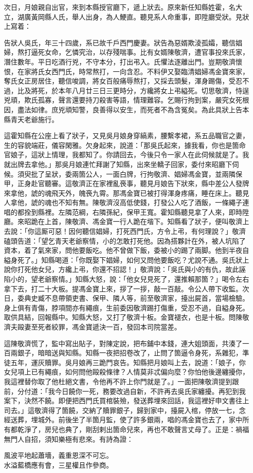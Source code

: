 次日，月娘親自出官，來到本縣授官廳下，遞上狀去。原來新任知縣姓霍，名大立，湖廣黃岡縣人氏，舉人出身，為人鯁直。聽見系人命重事，即陞廳受狀。見狀上寫着：

\begin{myquote}[\markfont]
告狀人吳氏，年三十四歲，系已故千戶西門慶妻。狀告為惡婿欺淩孤孀，聽信娼婦，熬打逼死女命，乞憐究治，以存殘喘事。比有女婿陳敬濟，遭官事投來氏家，潛住數年。平日吃酒行兇，不守本分，打出弔入。氏懼法逐離出門。豈期敬濟懷恨，在家將氏女西門氏，時常熬打，一向含忍。不料伊又娶臨清娼婦馮金寶來家，奪氏女正房居住，聽信唆調，將女百般痛辱熬打，又採去頭髮，渾身踢傷，受忍不過，比及將死，於本年八月廿三日三更時分，方纔將女上弔縊死。切思敬濟，恃逞兇頑，欺氏孤寡，聲言還要持刀殺害等語，情理難容。{}乞賜行拘到案，嚴究女死根因，盡法如律。庶兇頑知警，良善得以安生，而死者不為含冤矣。為此具狀上告本縣青天老爺施行。
\end{myquote}

這霍知縣在公座上看了狀子，又見吳月娘身穿縞素，腰繫孝裙，系五品職官之妻，生的容貌端莊，儀容閑雅。欠身起來，說道：「那吳氏起來，據我看，你也是箇命官娘子，這狀上情理，我都知了。你請回去，今後只令一家人在此伺候就是了。我就出牌去拿他。」那吳月娘連忙拜謝了知縣，出來坐轎子回家，委付來昭廳下伺候。須臾批了呈狀，委兩箇公人，一面白牌，行拘敬濟、娼婦馮金寶，並兩隣保甲，正身赴官聽審。這敬濟正在家裡亂䘮事，聽見月娘告下狀來，縣中差公人發牌來拿他，諕的魂飛天外，魄䘮九霄。那馮金寶已被打得渾身疼痛，睡在床上。聽見人拿他，諕的魂也不知有無。陳敬濟沒高低使錢，打發公人吃了酒飯，一條繩子連唱的都拴到縣裡。左隣范綱，右隣孫紀，保甲王寬。霍知縣聽見拿了人來，即時陞廳。來昭跪在上首，陳敬濟、馮金寶一行人跪在堦下。知縣看了狀子，便叫敬濟上去說：「你這厮可惡！因何聽信娼婦，打死西門氏，方令上弔，有何理說？」敬濟磕頭告道：「望乞青天老爺察情，小的怎敢打死他。因為搭夥計在外，被人坑陷了資本，着了氣來家，問他要飯吃。他不曾做下飯，委被小的踢了兩脚。他到半夜自縊身死了。」知縣喝道：「你既娶下娼婦，如何又問他要飯吃？尤說不通。吳氏狀上說你打死他女兒，方纔上弔，你還不招認！」敬濟說：「吳氏與小的有仇，故此誣陷小的，望老爺察情。」知縣大怒，說：「他女兒見死了，還推賴那箇？」喝令左右拿下去，打二十大板。提馮金寶上來，拶了一拶，敲一百敲。令公人帶下收監。次日，委典史臧不息帶領吏書、保甲、隣人等，前至敬濟家，擡出屍首，當場檢驗。身上俱有青傷，脖項間亦有繩痕，生前委因敬濟踢打傷重，受忍不過，自縊身死。{}取供具結，回報縣中。知縣大怒，又打了敬濟十板。金寶褪衣，也是十板。問陳敬濟夫毆妻至死者絞罪，馮金寶遞決一百，發回本司院當差。

這陳敬濟慌了，監中寫出貼子，對陳定說，把布鋪中本錢，連大姐頭面，共湊了一百兩銀子，暗暗送與知縣。知縣一夜把招卷改了，{}止問了箇逼令身死，系雜犯，準徒五年，運灰贖罪。吳月娘再三跪門哀告。知縣把月娘叫上去，說道：「娘子，你女兒項上已有繩痕，如何問他毆殺條律？人情莫非忒偏向麼？你怕他後邊纏擾你，我這裡替你取了他杜絕文書，令他再不許上你門就是了。」{}一面把陳敬濟提到跟前，分付道：「我今日饒你一死，務要改過自新，不許再去吳氏家纏擾。再犯到我案下，決然不饒。即便把西門氏買棺裝殮，發送葬埋來回話，我這裡好申文書往上司去。」這敬濟得了箇饒，交納了贖罪銀子，歸到家中，擡屍入棺，停放一七，念經送葬，埋城外。前後坐了半箇月監，使了許多銀兩，唱的馮金寶也去了，家中所有都乾淨了，房兒也典了，剛刮剌出箇命兒來，再也不敢聲言丈母了。正是：禍福無門人自招，須知樂極有悲來。有詩為證：

\begin{myquote}
風波平地起蕭墻，義重恩深不可忘。\\水溢藍橋應有會，三星權且作參商。
\end{myquote}
